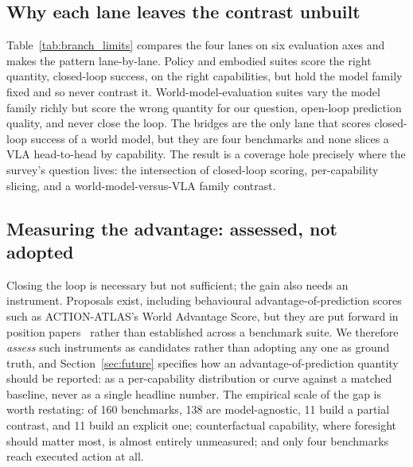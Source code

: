 

\subsection{Why each lane leaves the contrast unbuilt}

Table~\ref{tab:branch_limits} compares the four lanes on six evaluation axes and makes the pattern
lane-by-lane. Policy and embodied suites score the right quantity, closed-loop success, on the right
capabilities, but hold the model family fixed and so never contrast it. World-model-evaluation suites
vary the model family richly but score the wrong quantity for our question, open-loop prediction
quality, and never close the loop. The bridges are the only lane that scores closed-loop success of a
world model, but they are four benchmarks and none slices a VLA head-to-head by capability. The
result is a coverage hole precisely where the survey's question lives: the intersection of
closed-loop scoring, per-capability slicing, and a world-model-versus-VLA family contrast.



\subsection{Measuring the advantage: assessed, not adopted}

Closing the loop is necessary but not sufficient; the gain also needs an instrument. Proposals exist,
including behavioural advantage-of-prediction scores such as ACTION-ATLAS's World Advantage Score,
but they are put forward in position papers~\cite{pos_yangyu} rather than established across a
benchmark suite. We therefore \emph{assess} such instruments as candidates rather than adopting any
one as ground truth, and Section~\ref{sec:future} specifies how an advantage-of-prediction quantity
should be reported: as a per-capability distribution or curve against a matched baseline, never as a
single headline number. The empirical scale of the gap is worth restating: of 160 benchmarks, 138
are model-agnostic, 11 build a partial contrast, and 11 build an explicit one; counterfactual
capability, where foresight should matter most, is almost entirely unmeasured; and only four
benchmarks reach executed action at all.

\FloatBarrier
